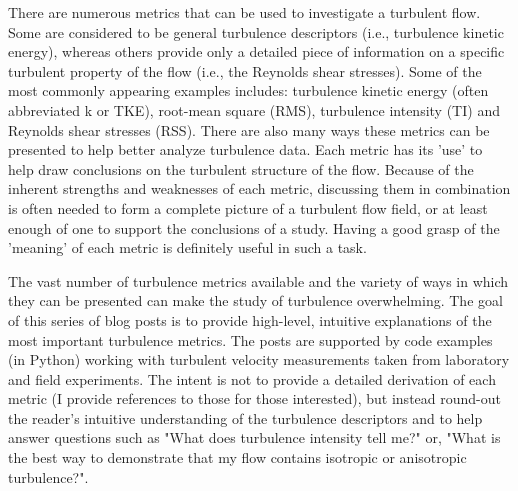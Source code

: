There are numerous metrics that can be used to investigate a turbulent flow. Some are considered to be general turbulence descriptors (i.e., turbulence kinetic energy), whereas others provide only a detailed piece of information on a specific turbulent property of the flow (i.e., the Reynolds shear stresses). Some of the most commonly appearing examples includes: turbulence kinetic energy (often abbreviated k or TKE), root-mean square (RMS), turbulence intensity (TI) and Reynolds shear stresses (RSS). There are also many ways these metrics can be presented to help better analyze turbulence data. Each metric has its 'use' to help draw conclusions on the turbulent structure of the flow. Because of the inherent strengths and weaknesses of each metric, discussing them in combination is often needed to form a complete picture of a turbulent flow field, or at least enough of one to support the conclusions of a study. Having a good grasp of the 'meaning' of each metric is definitely useful in such a task. 


The vast number of turbulence metrics available and the variety of ways in which they can be presented can make the study of turbulence overwhelming. The goal of this series of blog posts is to provide high-level, intuitive explanations of the most important turbulence metrics. The posts are supported by code examples (in Python) working with turbulent velocity measurements taken from laboratory and field experiments. The intent is not to provide a detailed derivation of each metric (I provide references to those for those interested), but instead round-out the reader's intuitive understanding of the turbulence descriptors and to help answer questions such as "What does turbulence intensity tell me?" or, "What is the best way to demonstrate that my flow contains isotropic or anisotropic turbulence?". 
